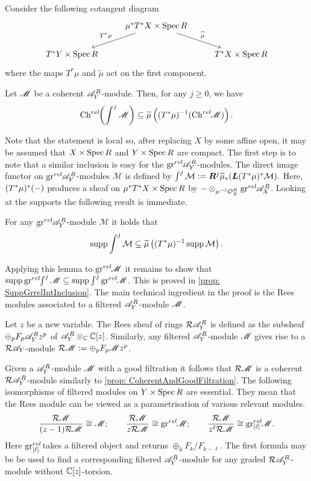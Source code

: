 \noindent
Consider the following cotangent diagram
$$
\begin{tikzcd}
    & \mu^* T^* X\times \Spec R \arrow[swap]{ld}{T^* \mu} \arrow{rd}{\widetilde{\mu}} & \\
    T^* Y\times \Spec R & & T^*X\times \Spec R
\end{tikzcd}
$$
where the maps $T^*\mu$ and $\widetilde{\mu}$ act on the first component.
\begin{theorem}\label{thm: KashiwaraEstimate}
    Let $\mathscr{M}$ be a coherent $\mathscr{A}_Y^R$-module. Then, for any $j\geq 0$, we have
    $$\operatorname{Ch}^{rel}\mkern-5mu\left(\int^j \mathscr{M} \right)\subseteq  \widetilde{\mu}\left((T^*\mu)^{-1}(\operatorname{Ch}^{rel}\mkern-5mu \mathscr{M}) \right).$$
\end{theorem}
Note that the statement is local so, after replacing $X$ by some affine open, it may be assumed that $X\times \operatorname{Spec} R$ and $Y\times \operatorname{Spec} R$ are compact.
The first step is to note that a similar inclusion is easy for the $\operatorname{gr}^{rel}\mkern-5mu \mathscr{A}_Y^R$-modules.
The direct image functor on $\operatorname{gr}^{rel}\mkern-5mu \mathscr{A}_Y^R$-modules $\mathcal{M}$ is defined by $\int^j \mathcal{M} :=  \boldsymbol{R}^j \widetilde{\mu}_* ( \boldsymbol{L}(T^*\mu)^*\mathcal{M}).$
Here, $(T^*\mu)^*({-})$ produces a sheaf on $\mu^*T^*X\times \operatorname{Spec} R$ by $ {-}\otimes_{\mu^{-1}\mathcal{O}_X^R} \operatorname{gr}^{rel}\mkern-5mu \mathscr{A}_X^R$.
Looking at the supports the following result is immediate.
\begin{lemma}
    For any $\operatorname{gr}^{rel}\mkern-5mu\mathscr{A}_Y^R$-module $\mathcal{M}$ it holds that
    $$\operatorname{supp} \int^j \mathcal{M}\subseteq \widetilde{\mu}\left((T^* \mu)^{-1} \operatorname{supp} \mathcal{M}\right).$$
\end{lemma}
Applying this lemma to $\operatorname{gr}^{rel}\mkern-5mu\mathscr{M}$ it remains to show that $\operatorname{supp}\operatorname{gr}^{rel}\mkern-5mu\int^j\mathscr{M}\subseteq \operatorname{supp}\int^j \operatorname{gr}^{rel}\mkern-5mu\mathscr{M}$. This is proved in \cref{prop: SuppGrrelIntInclusion}. The main technical ingredient in the proof is the Rees modules associated to a filtered $\mathscr{A}_Y^R$-module $\mathscr{M}$.
\begin{definition}
    Let $z$ be a new variable. The Rees sheaf of rings $\mathcal{R}\mathscr{A}_Y^R$ is defined as the subsheaf $\oplus_p F_p \mathscr{A}_Y^R z^p $ of $\mathscr{A}_Y^R \otimes_{\mathbb{C}} \mathbb{C}[z]$. Similarly, any filtered $\mathscr{A}_Y^R$-module $\mathscr{M}$ gives rise to a $\mathcal{R}\mathscr{A}_Y$-module $\mathcal{R}\mathscr{M} := \oplus_p F_p \mathscr{M} z^p$.
\end{definition}
Given a $\mathscr{A}_Y^R$-module $\mathscr{M}$ with a good filtration it follows that $\mathcal{R}\mathscr{M}$ is a coherent $\mathcal{R}\mathscr{A}_Y^R$-module similarly to \cref{prop: CoherentAndGoodFiltration}.
The following isomorphisms of filtered modules on $Y\times \operatorname{Spec} R$ are essential.
They mean that the Rees module can be viewed as a parametrisation of various relevant modules.
$$\frac{\mathcal{R}\mathscr{M}}{(z-1)\mathcal{R}\mathscr{M}} \cong \mathscr{M}; \qquad \frac{\mathcal{R}\mathscr{M}}{z\mathcal{R}\mathscr{M}} \cong \operatorname{gr}^{rel}\mkern-5mu \mathscr{M};\qquad \frac{\mathcal{R}\mathscr{M}}{z^\ell\mathcal{R}\mathscr{M}} \cong  \operatorname{gr}_{[\ell]}^{rel}\mkern-5mu\mathscr{M}.$$
Here $\operatorname{gr}_{[\ell]}^{rel}\mkern-5mu$ takes a filtered object and returns $\oplus_k F_{k}/F_{k-\ell}$.
The first formula may be be used to find a corresponding filtered $\mathscr{A}_Y^R$-module for any graded $\mathcal{R}\mathscr{A}_Y^R$-module without $\mathbb{C}[z]$-torsion.

